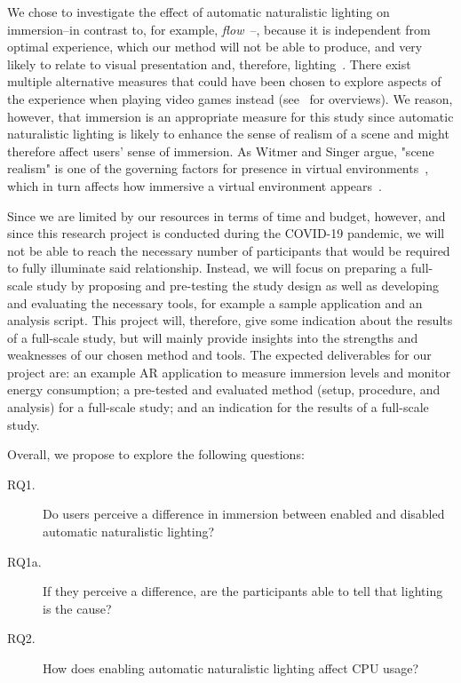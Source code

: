 \documentclass[12pt,twoside,english]{article}
\begin{document}
We chose to investigate the effect of automatic naturalistic lighting on immersion--in contrast to, for example, \textit{flow}~\cite{csikszentmihalyi_flow_1990}--, because it is independent from optimal experience, which our method will not be able to produce, and very likely to relate to visual presentation and, therefore, lighting~\cite{jennett_measuring_2008}.
There exist multiple alternative measures that could have been chosen to explore aspects of the experience when playing video games instead (see~\cite{dey_systematic_2018, dunser_survey_2008} for overviews).
We reason, however, that immersion is an appropriate measure for this study since automatic naturalistic lighting is likely to enhance the sense of realism of a scene and might therefore affect users' sense of immersion.
As Witmer and Singer argue, "scene realism" is one of the governing factors for presence in virtual environments~\cite{witmer_measuring_1998}, which in turn affects how immersive a virtual environment appears~\cite{jennett_measuring_2008}.

Since we are limited by our resources in terms of time and budget, however, and since this research project is conducted during the COVID-19 pandemic, we will not be able to reach the necessary number of participants that would be required to fully illuminate said relationship.
Instead, we will focus on preparing a full-scale study by proposing and pre-testing the study design as well as developing and evaluating the necessary tools, for example a sample application and an analysis script.
This project will, therefore, give some indication about the results of a full-scale study, but will mainly provide insights into the strengths and weaknesses of our chosen method and tools.
The expected deliverables for our project are: an example \gls{AR} application to measure immersion levels and monitor energy consumption; a pre-tested and evaluated method (setup, procedure, and analysis) for a full-scale study; and an indication for the results of a full-scale study.


Overall, we propose to explore the following questions:

\begin{description}
    \item[RQ1.] Do users perceive a difference in immersion between enabled and disabled automatic naturalistic lighting?
    \item[RQ1a.] If they perceive a difference, are the participants able to tell that lighting is the cause?
    \item[RQ2.] How does enabling automatic naturalistic lighting affect \gls{CPU} usage?
\end{description}
\end{document}
